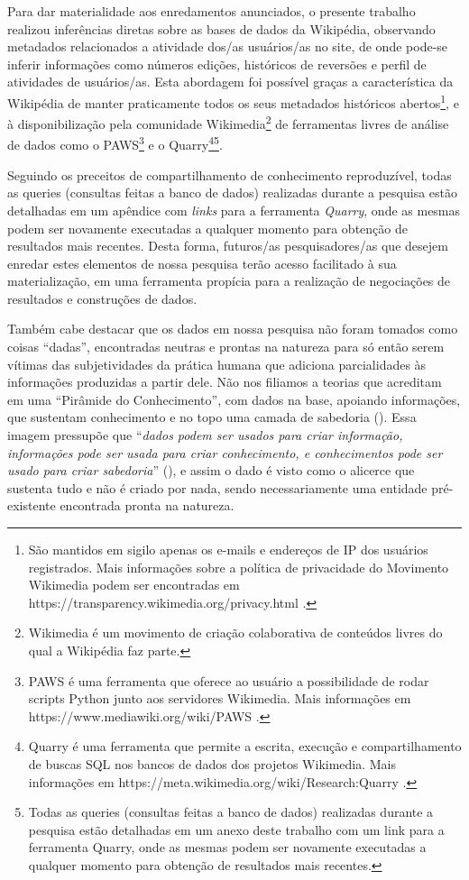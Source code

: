 Para dar materialidade aos enredamentos anunciados, o presente trabalho realizou inferências diretas sobre as bases de dados da Wikipédia, observando metadados relacionados a atividade dos/as usuários/as no site, de onde pode-se inferir informações como números edições, históricos de reversões e perfil de atividades de usuários/as. Esta abordagem foi possível graças a característica da Wikipédia de manter praticamente todos os seus metadados históricos abertos\footnote{São mantidos em sigilo apenas os e-mails e endereços de IP dos usuários registrados. Mais informações sobre a política de privacidade do Movimento Wikimedia podem ser encontradas em https://transparency.wikimedia.org/privacy.html .}, e à disponibilização pela comunidade Wikimedia\footnote{Wikimedia é um movimento de criação colaborativa de conteúdos livres do qual a Wikipédia faz parte.} de ferramentas livres de análise de dados como o PAWS\footnote{PAWS é uma ferramenta que oferece ao usuário a possibilidade de rodar scripts Python junto aos servidores Wikimedia. Mais informações em https://www.mediawiki.org/wiki/PAWS .} e o Quarry\footnote{Quarry é uma ferramenta que permite a escrita, execução e compartilhamento de buscas SQL nos bancos de dados dos projetos Wikimedia. Mais informações em https://meta.wikimedia.org/wiki/Research:Quarry .}\footnote{Todas as queries (consultas feitas a banco de dados) realizadas durante a pesquisa estão detalhadas em um anexo deste trabalho com um link para a ferramenta Quarry, onde as mesmas podem ser novamente executadas a qualquer momento para obtenção de resultados mais recentes.}.

Seguindo os preceitos de compartilhamento de conhecimento reproduzível, todas as queries (consultas feitas a banco de dados) realizadas durante a pesquisa estão detalhadas em um apêndice com \textit{links} para a ferramenta \textit{Quarry}, onde as mesmas podem ser novamente executadas a qualquer momento para obtenção de resultados mais recentes. Desta forma, futuros/as pesquisadores/as que desejem enredar estes elementos de nossa pesquisa terão acesso facilitado à sua materialização, em uma ferramenta propícia para a realização de negociações de resultados e construções de dados.

Também cabe destacar que os dados em nossa pesquisa não foram tomados como coisas ``dadas'', encontradas neutras e prontas na natureza para só então serem vítimas das subjetividades da prática humana que adiciona parcialidades às informações produzidas a partir dele.  Não nos filiamos a teorias que acreditam em uma ``Pirâmide do Conhecimento'', com dados na base, apoiando informações, que sustentam conhecimento e no topo uma camada de sabedoria (\cite{ackoff_data_1989}). Essa imagem pressupõe que ``\textit{dados podem ser usados para criar informação, informações pode ser usada para criar conhecimento, e conhecimentos pode ser usado para criar sabedoria}'' (\cite[164]{rowley_dikw_wisdom_2007}), e assim o dado é visto como o alicerce que sustenta tudo e não é criado por nada, sendo necessariamente uma entidade pré-existente encontrada pronta na natureza.

